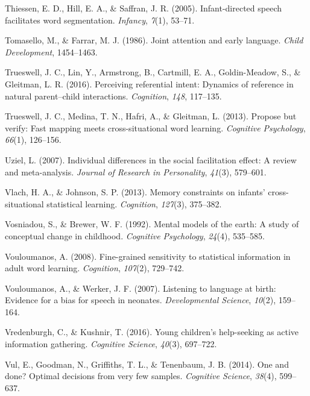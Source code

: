 \documentclass[oneside]{report}
\begin{document}
\hypertarget{ref-thiessen2005infant}{}
Thiessen, E. D., Hill, E. A., \& Saffran, J. R. (2005). Infant-directed
speech facilitates word segmentation. \emph{Infancy}, \emph{7}(1),
53--71.

\hypertarget{ref-tomasello1986joint}{}
Tomasello, M., \& Farrar, M. J. (1986). Joint attention and early
language. \emph{Child Development}, 1454--1463.

\hypertarget{ref-trueswell2016perceiving}{}
Trueswell, J. C., Lin, Y., Armstrong, B., Cartmill, E. A.,
Goldin-Meadow, S., \& Gleitman, L. R. (2016). Perceiving referential
intent: Dynamics of reference in natural parent--child interactions.
\emph{Cognition}, \emph{148}, 117--135.

\hypertarget{ref-trueswell2013propose}{}
Trueswell, J. C., Medina, T. N., Hafri, A., \& Gleitman, L. (2013).
Propose but verify: Fast mapping meets cross-situational word learning.
\emph{Cognitive Psychology}, \emph{66}(1), 126--156.

\hypertarget{ref-uziel2007individual}{}
Uziel, L. (2007). Individual differences in the social facilitation
effect: A review and meta-analysis. \emph{Journal of Research in
Personality}, \emph{41}(3), 579--601.

\hypertarget{ref-vlach2013memory}{}
Vlach, H. A., \& Johnson, S. P. (2013). Memory constraints on infants'
cross-situational statistical learning. \emph{Cognition}, \emph{127}(3),
375--382.

\hypertarget{ref-vosniadou1992mental}{}
Vosniadou, S., \& Brewer, W. F. (1992). Mental models of the earth: A
study of conceptual change in childhood. \emph{Cognitive Psychology},
\emph{24}(4), 535--585.

\hypertarget{ref-vouloumanos2008fine}{}
Vouloumanos, A. (2008). Fine-grained sensitivity to statistical
information in adult word learning. \emph{Cognition}, \emph{107}(2),
729--742.

\hypertarget{ref-vouloumanos2007listening}{}
Vouloumanos, A., \& Werker, J. F. (2007). Listening to language at
birth: Evidence for a bias for speech in neonates. \emph{Developmental
Science}, \emph{10}(2), 159--164.

\hypertarget{ref-vredenburgh2016young}{}
Vredenburgh, C., \& Kushnir, T. (2016). Young children's help-seeking as
active information gathering. \emph{Cognitive Science}, \emph{40}(3),
697--722.

\hypertarget{ref-vul2014}{}
Vul, E., Goodman, N., Griffiths, T. L., \& Tenenbaum, J. B. (2014). One
and done? Optimal decisions from very few samples. \emph{Cognitive
Science}, \emph{38}(4), 599--637.
\end{document}
